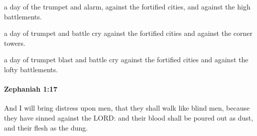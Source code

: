 			\begin{versebox}
					\item[BHS] 
					\item[LXX] 
					\item[ASV] a day of the trumpet and alarm, against the fortified cities, and against the high battlements.
					\item[NIV] a day of trumpet and battle cry against the fortified cities and against the corner towers.
					\item[NRSV] a day of trumpet blast and battle cry against the fortified cities and against the lofty battlements.
			\end{versebox}

		\paragraph{Zephaniah 1:17} %
			\label{ZEPHANIAH-1-17}

			And I will bring distress upon men, that they shall walk like blind men, because they have sinned against the LORD: and their blood shall be poured out as dust, and their flesh as the dung.

